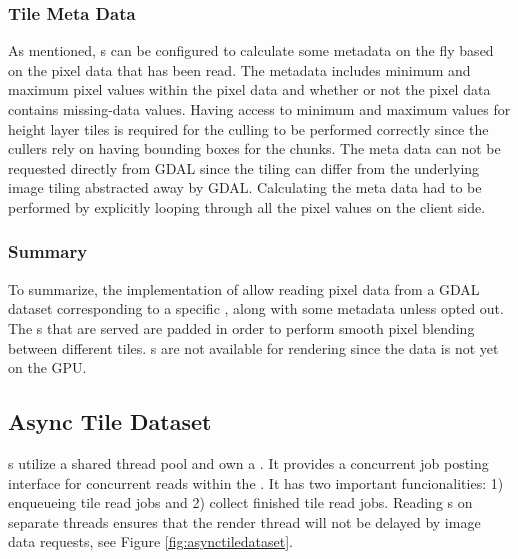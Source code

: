 \subsubsection{Tile Meta Data}
As mentioned, s can be configured to calculate some metadata on the fly based on the pixel data that has been read. The metadata includes minimum and maximum pixel values within the pixel data and whether or not the pixel data contains missing-data values. Having access to minimum and maximum values for height layer tiles is required for the culling to be performed correctly since the cullers rely on having bounding boxes for the chunks. The meta data can not be requested directly from GDAL since the tiling can differ from the underlying image tiling abstracted away by GDAL. Calculating the meta data had to be performed by explicitly looping through all the pixel values on the client side. 

\subsubsection{Summary}
To summarize, the implementation of  allow reading pixel data from a GDAL dataset corresponding to a specific , along with some metadata unless opted out. The s that are served are padded in order to perform smooth pixel blending between different tiles. s are not available for rendering since the data is not yet on the GPU.

\subsection{Async Tile Dataset}
s utilize a shared thread pool and own a . It provides a concurrent job posting interface for concurrent reads within the . It has two important funcionalities: 1) enqueueing tile read jobs and 2) collect finished tile read jobs. Reading s on separate threads ensures that the render thread will not be delayed by image data requests, see Figure \ref{fig:asynctiledataset}.

